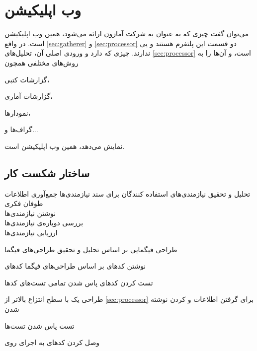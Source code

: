 \section{وب اپلیکیشن}\label{sec:web-app}
می‌توان گفت چیزی که به عنوان 
به شرکت آمازون ارائه می‌شود، همین وب ‌اپلیکیشن است.
در واقع 
\ref{sec:gatherer}
و
\ref{sec:processor}
دو قسمت 
این پلتفرم هستند و 
یی
ندارند. چیزی که 
دارد و ورودی اصلی آن، تحلیل‌های 
\ref{sec:processor}
است، و آن‌ها را به روش‌های مختلفی همچون
\begin{enumerate*}
\item 
گزارشات کتبی،
\item
گزارشات آماری،
\item 
نمودار‌ها،
\item 
گراف‌‌ها و...
\end{enumerate*}
نمایش می‌دهد، همین وب‌ اپلیکیشن است.

\subsection{ساختار شکست کار}
\begin{wbsbox}{}
\begin{wbssub}
{تحلیل و تحقیق نیازمندی‌های استفاده کنندگان  برای }
{سند نیازمندی‌ها}
\task
جمع‌آوری اطلاعات \\
\task 
طوفان فکری \\
\task 
نوشتن نیازمندی‌ها \\
\task
بررسی دوباره‌ی نیازمندی‌ها \\
\task 
ارزیابی نیازمندی‌ها
\end{wbssub}

\begin{wbssub}
{طراحی فیگمایی  بر اساس تحلیل و تحقیق }
{طراحی‌های فیگما}
\end{wbssub}

\begin{wbssub}
{نوشتن کد‌‌های  بر اساس طراحی‌های فیگما}
{کد‌های }
\end{wbssub}

\begin{wbssub}
{تست کردن کد‌های }
{پاس شدن تمامی تست‌های کد‌ها}
\end{wbssub}

\begin{wbssub}
{طراحی یک  با سطح انتزاع بالاتر از \ref{sec:processor} برای گرفتن اطلاعات و  کردن}
{نوشته شدن }
\end{wbssub}

\begin{wbssub}
{تست }
{پاس شدن تست‌ها}
\end{wbssub}

\begin{wbssub}
{وصل کردن کد‌های  به }
{اجرای  روی }
\end{wbssub}
\end{wbsbox}
